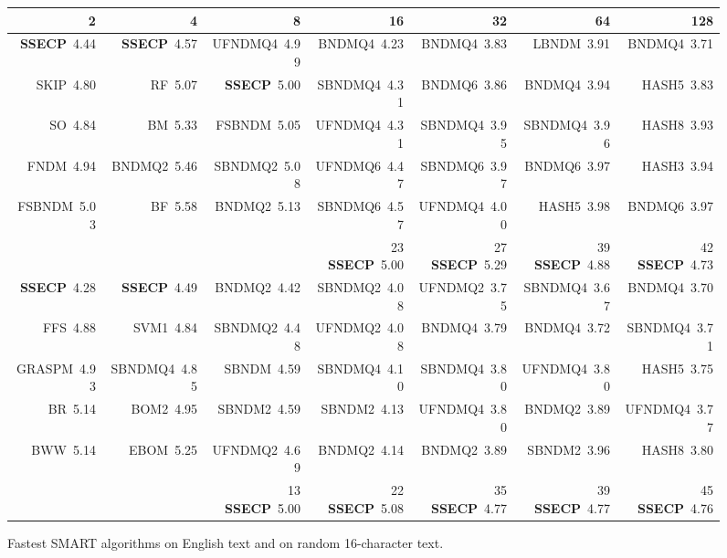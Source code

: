 \documentclass[12pt]{article}
\begin{document}
\begin{figure}[htb]
\begin{center}
\begin{tabular}{r r r r r r r }
\tiny 2 & \tiny 4 & \tiny 8 & \tiny 16 & \tiny 32 & \tiny 64 & \tiny 128 \\ \hline
\tiny{\bf SSECP}~4.44&\tiny{\bf SSECP}~4.57&\tiny UFNDMQ4~4.99&\tiny BNDMQ4~4.23&\tiny BNDMQ4~3.83&\tiny LBNDM~3.91&\tiny BNDMQ4~3.71 \\
\tiny SKIP~4.80& \tiny RF~5.07&\tiny{\bf SSECP}~5.00&\tiny SBNDMQ4~4.31&\tiny BNDMQ6~3.86&\tiny BNDMQ4~3.94&\tiny HASH5~3.83\\
\tiny SO~4.84&\tiny BM~5.33&\tiny FSBNDM~5.05&\tiny UFNDMQ4~4.31&\tiny SBNDMQ4~3.95&\tiny SBNDMQ4~3.96&\tiny HASH8~3.93\\
\tiny FNDM~4.94&\tiny BNDMQ2~5.46&\tiny SBNDMQ2~5.08&\tiny UFNDMQ6~4.47&\tiny SBNDMQ6~3.97&\tiny BNDMQ6~3.97&\tiny HASH3~3.94\\
\tiny FSBNDM~5.03&\tiny BF~5.58& \tiny BNDMQ2~5.13&\tiny SBNDMQ6~4.57&\tiny UFNDMQ4~4.00&\tiny HASH5~3.98&\tiny BNDMQ6~3.97\\
& & & \tiny 23 {\bf SSECP}~5.00& \tiny 27 {\bf SSECP}~5.29& \tiny 39 {\bf SSECP}~4.88 &\tiny 42 {\bf SSECP}~4.73 \\
\hline %
\tiny{\bf SSECP}~4.28&\tiny{\bf SSECP}~4.49&\tiny BNDMQ2~4.42&\tiny SBNDMQ2~4.08&\tiny UFNDMQ2~3.75&\tiny SBNDMQ4~3.67&\tiny BNDMQ4~3.70\\
\tiny FFS~4.88& \tiny SVM1~4.84&\tiny SBNDMQ2~4.48&\tiny UFNDMQ2~4.08&\tiny BNDMQ4~3.79&\tiny BNDMQ4~3.72&\tiny SBNDMQ4~3.71\\
\tiny GRASPM~4.93&\tiny SBNDMQ4~4.85&\tiny SBNDM~4.59&\tiny SBNDMQ4~4.10&\tiny SBNDMQ4~3.80&\tiny UFNDMQ4~3.80&\tiny HASH5~3.75\\
\tiny BR~5.14&\tiny BOM2~4.95&\tiny SBNDM2~4.59&\tiny SBNDM2~4.13&\tiny UFNDMQ4~3.80&\tiny BNDMQ2~3.89&\tiny UFNDMQ4~3.77\\
\tiny BWW~5.14&\tiny EBOM~5.25& \tiny UFNDMQ2~4.69&\tiny BNDMQ2~4.14&\tiny BNDMQ2~3.89&\tiny SBNDM2~3.96&\tiny HASH8~3.80\\
& & \tiny 13 {\bf SSECP}~5.00& \tiny 22 {\bf SSECP}~5.08& \tiny 35 {\bf SSECP}~4.77& \tiny 39 {\bf SSECP}~4.77&\tiny 45 {\bf SSECP}~4.76 
\end{tabular}
\end{center}
\caption{\small\label{tab:smart}Fastest SMART algorithms on English text
and on random 16-character text.}
\end{figure}
\end{document}
